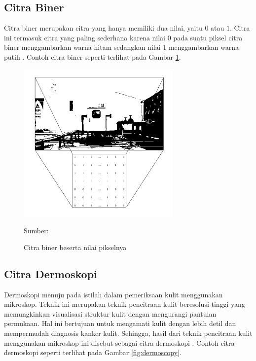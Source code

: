     \subsection{Citra Biner}
    Citra biner merupakan citra yang hanya memiliki dua nilai, yaitu $0$ atau $1$. Citra ini termasuk citra yang paling sederhana karena nilai $0$ pada suatu piksel citra biner menggambarkan warna hitam sedangkan nilai $1$ menggambarkan warna putih \citep{Kusumanto2011}. Contoh citra biner seperti terlihat pada Gambar \ref{fig:binary}.

    \begin{figure}[H]
        \begin{center}
            \includegraphics[width=8cm]{../img/Binary - Latex.png}
            \caption{Citra biner beserta nilai pikselnya}
            \label{fig:binary}
            Sumber: \citep{Kusumanto2011}
        \end{center}
    \end{figure}

    \subsection{Citra Dermoskopi}
    Dermoskopi menuju pada istilah dalam pemeriksaan kulit menggunakan mikroskop. Teknik ini merupakan teknik pencitraan kulit beresolusi tinggi yang memungkinkan visualisasi struktur kulit dengan mengurangi pantulan permukaan. Hal ini bertujuan untuk mengamati kulit dengan lebih detil dan mempermudah diagnosis kanker kulit. Sehingga, hasil dari teknik pencitraan kulit menggunakan mikroskop ini disebut sebagai citra dermoskopi \citep{Celebi2019}. Contoh citra dermoskopi seperti terlihat pada Gambar \ref{fig:dermoscopy}.

